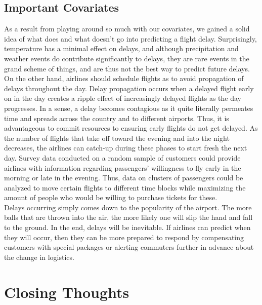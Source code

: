 \documentclass[12pt, a4paper, openany]{book}
\newcommand\tab[1][1cm]{\hspace*{#1}}
\begin{document}
	\section{Important Covariates}
	\tab As a result from playing around so much with our covariates, we gained a solid idea of what does and what doesn’t go into predicting a flight delay. Surprisingly, temperature has a minimal effect on delays, and although precipitation and weather events do contribute significantly to delays, they are rare events in the grand scheme of things, and are thus not the best way to predict future delays. On the other hand, airlines should schedule flights as to avoid propagation of delays throughout the day. Delay propagation occurs when a delayed flight early on in the day creates a ripple effect of increasingly delayed flights as the day progresses. In a sense, a delay becomes contagious as it quite literally permeates time and spreads across the country and to different airports. Thus, it is advantageous to commit resources to ensuring early flights do not get delayed. As the number of flights that take off toward the evening and into the night decreases, the airlines can catch-up during these phases to start fresh the next day. Survey data conducted on a random sample of customers could provide airlines with information regarding passengers’ willingness to fly early in the morning or late in the evening. Thus, data on clusters of passengers could be analyzed to move certain flights to different time blocks while maximizing the amount of people who would be willing to purchase tickets for these. \\
	\tab Delays occurring simply comes down to the popularity of the airport. The more balls that are thrown into the air, the more likely one will slip the hand and fall to the ground. In the end, delays will be inevitable. If airlines can predict when they will occur, then they can be more prepared to respond by compensating customers with special packages or alerting commuters further in advance about the change in logistics. 
\chapter{Closing Thoughts}
\end{document}
